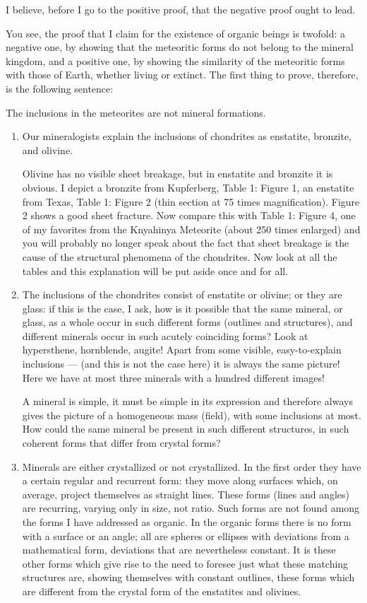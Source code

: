 \documentclass[a4paper, 12pt, oneside]{article}
\begin{document}
I believe, before I go to the positive proof, that the negative proof ought to lead.

You see, the proof that I claim for the existence of organic beings is twofold: a negative one, by showing that the meteoritic forms do not belong to the mineral kingdom, and a positive one, by showing the similarity of the meteoritic forms with those of Earth, whether living or extinct. The first thing to prove, therefore, is the following sentence:

The inclusions in the meteorites are not mineral formations.
\begin{enumerate}
    \item Our mineralogists explain the inclusions of chondrites as enstatite, bronzite, and olivine. 
    
    Olivine has no visible sheet breakage, but in enstatite and bronzite it is obvious. I depict a bronzite from Kupferberg, Table 1: Figure 1, an enstatite from Texas, Table 1: Figure 2 (thin section at 75 times magnification). Figure 2 shows a good sheet fracture. Now compare this with Table 1: Figure 4, one of my favorites from the Knyahinya Meteorite (about 250 times enlarged) and you will probably no longer speak about the fact that sheet breakage is the cause of the structural phenomena of the chondrites. Now look at all the tables and this explanation will be put aside once and for all.
    \item The inclusions of the chondrites consist of enstatite or olivine; or they are glass: if this is the case, I ask, how is it possible that the same mineral, or glass, as a whole occur in such different forms (outlines and structures), and different minerals occur in such acutely coinciding forms? Look at hypersthene, hornblende, augite! Apart from some visible, easy-to-explain inclusions — (and this is not the case here) it is always the same picture! Here we have at most three minerals with a hundred different images!
    
    A mineral is simple, it must be simple in its expression and therefore always gives the picture of a homogeneous mass (field), with some inclusions at most. How could the same mineral be present in such different structures, in such coherent forms that differ from crystal forms?
    \item Minerals are either crystallized or not crystallized. In the first order they have a certain regular and recurrent form: they move along surfaces which, on average, project themselves as straight lines. These forms (lines and angles) are recurring, varying only in size, not ratio. Such forms are not found among the forms I have addressed as organic. In the organic forms there is no form with a surface or an angle; all are spheres or ellipses with deviations from a mathematical form, deviations that are nevertheless constant. It is these other forms which give rise to the need to foresee just what these matching structures are, showing themselves with constant outlines, these forms which are different from the crystal form of the enstatites and olivines.
    

\end{enumerate}
\end{document}
